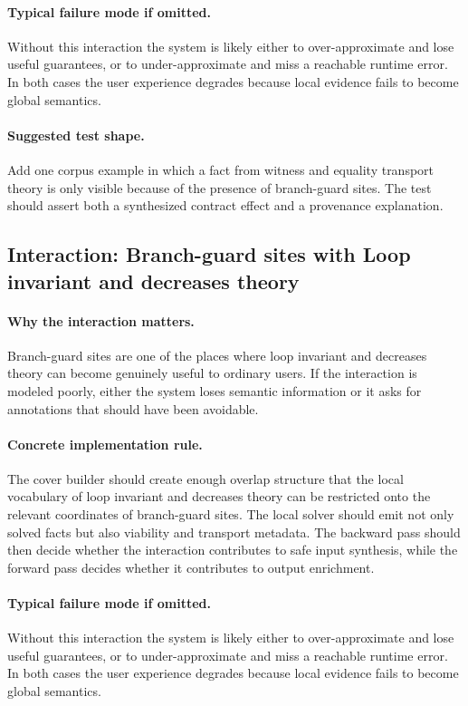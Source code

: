 \documentclass[11pt]{report}
\theoremstyle{definition}
\theoremstyle{plain}
\begin{document}
\paragraph{Typical failure mode if omitted.}
Without this interaction the system is likely either to over-approximate and
lose useful guarantees, or to under-approximate and miss a reachable runtime
error. In both cases the user experience degrades because local evidence
fails to become global semantics.

\paragraph{Suggested test shape.}
Add one corpus example in which a fact from witness and equality transport theory is only
visible because of the presence of branch-guard sites. The test should
assert both a synthesized contract effect and a provenance explanation.

\subsection{Interaction: Branch-guard sites with Loop invariant and decreases theory}

\paragraph{Why the interaction matters.}
Branch-guard sites are one of the places where loop invariant and decreases theory can become
genuinely useful to ordinary users. If the interaction is modeled poorly,
either the system loses semantic information or it asks for annotations that
should have been avoidable.

\paragraph{Concrete implementation rule.}
The cover builder should create enough overlap structure that the local
vocabulary of loop invariant and decreases theory can be restricted onto the relevant
coordinates of branch-guard sites. The local solver should emit not only
solved facts but also viability and transport metadata. The backward pass
should then decide whether the interaction contributes to safe input
synthesis, while the forward pass decides whether it contributes to output
enrichment.

\paragraph{Typical failure mode if omitted.}
Without this interaction the system is likely either to over-approximate and
lose useful guarantees, or to under-approximate and miss a reachable runtime
error. In both cases the user experience degrades because local evidence
fails to become global semantics.
\end{document}
